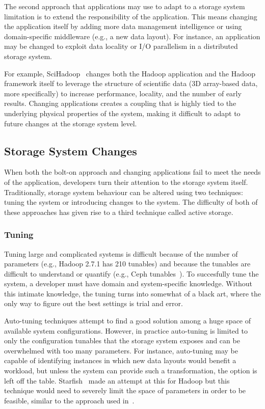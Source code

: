 \documentclass[10pt,twocolumn]{article}
\begin{document}
The second approach that applications may use to adapt to a storage system
limitation is to
extend the responsibility of the application. This means changing the
application itself by adding more data management intelligence or
using domain-specific middleware (e.g., a new data layout). For instance, an
application may be changed to exploit data locality or I/O
parallelism in a distributed storage system.

For example, SciHadoop~\cite{buck:hpc2011-scihadoop,buck:sc2013-scidr} changes both the Hadoop
application and the Hadoop framework itself to leverage the structure of
scientific data (3D array-based data, more specifically) to increase
performance, locality, and the number of early results. %
Changing applications creates a coupling that is highly tied to the
underlying physical properties of the system, making it difficult to
adapt to future changes at the storage system level.

\subsection{Storage System Changes}\label{storage-changes}

When both the bolt-on approach and changing applications fail to meet the needs of the application,
developers turn their attention to the storage system itself.
Traditionally, storage system behaviour can be altered using two
techniques: tuning the system or introducing changes to the system. The
difficulty of both of these approaches has given rise to a third
technique called active storage.

\subsubsection{Tuning}\label{tuning}

Tuning large and complicated systems is difficult because of the number
of parameters (e.g., Hadoop 2.7.1 has 210 tunables) and because the
tunables are difficult to understand or quantify (e.g., Ceph tunables~\cite{sevilla:sc15-mantle}). To succesfully tune the system, a
developer must have domain and system-specific knowledge. Without this
intimate knowledge, the tuning turns into somewhat of a black art, where
the only way to figure out the best settings is trial and error.

Auto-tuning techniques attempt to find a good solution among a huge space of
available system configurations. However, in practice auto-tuning is limited
to only the configuration tunables that the storage system exposes and can be
overwhelmed with too many parameters.  For instance, auto-tuning may be
capable of identifying instances in which new data layouts would benefit a
workload, but unless the system can provide such a transformation, the option
is left off the table.  Starfish~\cite{herodotou:cidr2011-starfish} made
an attempt at this for Hadoop but this technique would need to severely limit
the space of parameters in order to be feasible, similar to the approach used in~\cite{behzad:sc2013-autotuning}.
\end{document}
